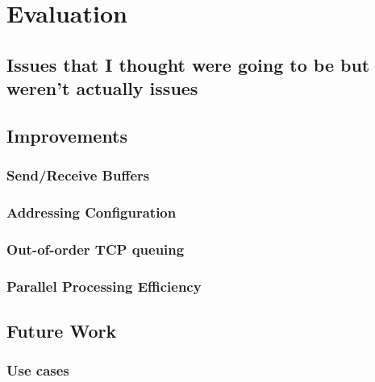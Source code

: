 
\section{Evaluation} %
    \subsection{Issues that I thought were going to be but weren't actually issues}
    \subsection{Improvements}
        \subsubsection{Send/Receive Buffers}

        \subsubsection{Addressing Configuration}
        \subsubsection{Out-of-order TCP queuing}

        \subsubsection{Parallel Processing Efficiency}

    \subsection{Future Work}
        \subsubsection{Use cases}


